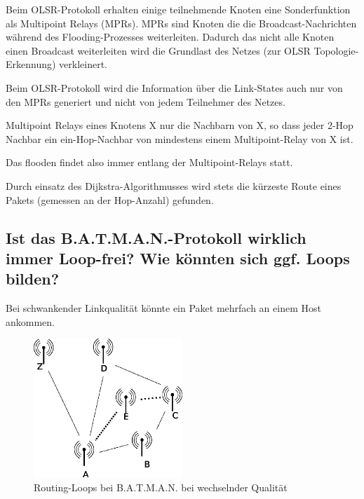 \documentclass[a4paper,10pt]{article}
\begin{document}
Beim OLSR-Protokoll erhalten einige teilnehmende Knoten eine Sonderfunktion als Multipoint Relays (MPRs).
MPRs sind Knoten die die Broadcast-Nachrichten während des Flooding-Prozesses weiterleiten. Dadurch das nicht alle
Knoten einen Broadcast weiterleiten wird die Grundlast des Netzes (zur OLSR Topologie-Erkennung) verkleinert.

Beim OLSR-Protokoll wird die Information über die Link-States auch nur von den MPRs generiert und nicht von jedem
Teilnehmer des Netzes.

Multipoint Relays eines Knotens X nur die Nachbarn von X, so dass
jeder 2-Hop Nachbar ein ein-Hop-Nachbar von mindestens einem Multipoint-Relay von X ist.

Das flooden findet also immer entlang der Multipoint-Relays statt.

Durch einsatz des Dijkstra-Algorithmusses wird stets die kürzeste Route 
eines Pakets (gemessen an der Hop-Anzahl) gefunden.

\subsection{Ist das B.A.T.M.A.N.-Protokoll wirklich immer Loop-frei? Wie könnten sich ggf. Loops bilden?}

Bei schwankender Linkqualität könnte ein Paket mehrfach an einem Host ankommen.

\begin{figure}[thb]
 \begin{center}
   \includegraphics[width=0.5\textwidth]{loop-routing.png}
    \caption{Routing-Loops bei B.A.T.M.A.N. bei wechselnder Qualität}
    \label{batman-loop-air}
  \end{center}
\end{figure}
\end{document}
